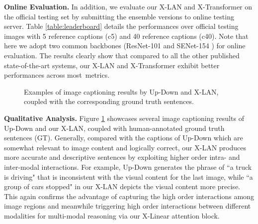 \documentclass[10pt,twocolumn,letterpaper]{article}
\begin{document}
\noindent\textbf{Online Evaluation.}
In addition, we evaluate our X-LAN and X-Transformer on the official testing set by submitting the ensemble versions to online testing server. Table \ref{table:leaderboard} details the performances over official testing images with 5 reference captions (c5) and 40 reference captions (c40). Note that here we adopt two common backbones (ResNet-101 \cite{He:CVPR16} and SENet-154 \cite{hu2018squeeze}) for online evaluation.
The results clearly show that compared to all the other published state-of-the-art systems, our X-LAN and X-Transformer exhibit better performances across most~metrics.

\begin{figure}[!tb]
\vspace{-0.06in}
\vspace{-0.05in}
\caption{\small Examples of image captioning results by Up-Down and X-LAN, coupled with the corresponding ground truth sentences.}
\label{fig:results}
\vspace{-0.18in}
\end{figure}

\noindent\textbf{Qualitative Analysis.}
Figure \ref{fig:results} showcases several image captioning results of Up-Down and our X-LAN, coupled with human-annotated ground truth sentences (GT). Generally, compared with the captions of Up-Down which are somewhat relevant to image content and logically correct, our X-LAN produces more accurate and descriptive sentences by exploiting higher order intra- and inter-modal interactions.
For example, Up-Down generates the phrase of ``a truck is driving" that is inconsistent with the visual content for the last image, while ``a group of cars stopped" in our X-LAN depicts the visual content more precise.
This again confirms the advantage of capturing the high order interactions among image regions and meanwhile triggering high order interactions between different modalities for multi-modal reasoning via our X-Linear attention block.
\end{document}
